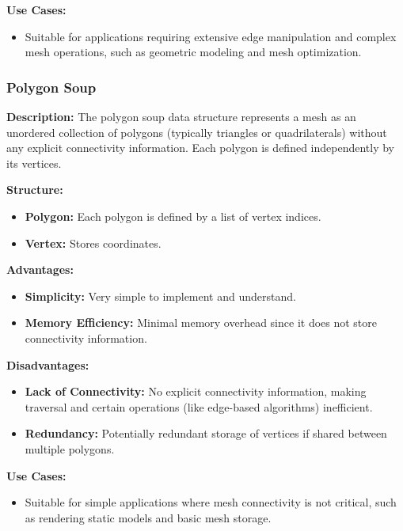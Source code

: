 \documentclass{article}
\begin{document}
\textbf{Use Cases:}

\begin{itemize}
    \item Suitable for applications requiring extensive edge manipulation and complex mesh operations, such as geometric modeling and mesh optimization.
\end{itemize}

\subsubsection{Polygon Soup}

\textbf{Description:} The polygon soup data structure represents a mesh as an unordered collection of polygons (typically triangles or quadrilaterals) without any explicit connectivity information. Each polygon is defined independently by its vertices.

\textbf{Structure:}

\begin{itemize}
    \item \textbf{Polygon:} Each polygon is defined by a list of vertex indices.
    \item \textbf{Vertex:} Stores coordinates.
\end{itemize}

\textbf{Advantages:}

\begin{itemize}
    \item \textbf{Simplicity:} Very simple to implement and understand.
    \item \textbf{Memory Efficiency:} Minimal memory overhead since it does not store connectivity information.
\end{itemize}

\textbf{Disadvantages:}

\begin{itemize}
    \item \textbf{Lack of Connectivity:} No explicit connectivity information, making traversal and certain operations (like edge-based algorithms) inefficient.
    \item \textbf{Redundancy:} Potentially redundant storage of vertices if shared between multiple polygons.
\end{itemize}

\textbf{Use Cases:}

\begin{itemize}
    \item Suitable for simple applications where mesh connectivity is not critical, such as rendering static models and basic mesh storage.
\end{itemize}
\end{document}
